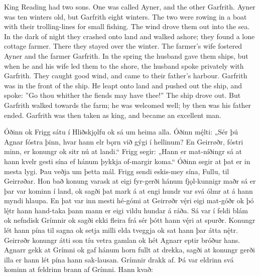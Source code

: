 \bpb King Reading had two sons. One was called Ayner, and the other Garfrith.
Ayner was ten winters old, but Garfrith eight winters. The two were rowing in a boat with their trolling-lines for small fishing.
The wind drove them out into the sea. In the dark of night they crashed onto land and walked ashore; they found a lone cottage farmer.
There they stayed over the winter. The farmer’s wife fostered Ayner and the farmer Garfrith.
In the spring the husband gave them ships, but when he and his wife led them to the shore, the husband spoke privately with Garfrith.
They caught good wind, and came to their father’s harbour. Garfrith was in the front of the ship.
He leapt onto land and pushed out the ship, and spoke: ”Go thou whither the fiends may have thee!”
The ship drove out. But Garfrith walked towards the farm; he was welcomed well; by then was his father ended.
Garfrith was then taken as king, and became an excellent man.\epb\epg


\bpg\bpa{}%
Óðinn ok Frigg sátu í Hliðskjǫlfu ok sá um heima alla.
Óðinn mę́lti: „Sér þú Agnar fóstra þinn, hvar hann elr bǫrn við gýgi í hellinum?
En Geirrøðr, fóstri minn, er konungr ok sitr nú at landi.“
Frigg segir: „Hann er mat-níðingr sá at hann kvelr gesti sína ef hánum þykkja of-margir koma.“
Óðinn segir at þat er in mesta lygi. Þau veðja um þetta mál.
Frigg sendi eskis-mey sína, Fullu, til Geirrøðar. Hon bað konung varask at eigi fyr-gerði hánum fjǫl-kunnigr maðr sá er þar var kominn í land, ok sagði þat mark á at engi hundr var svá ólmr at á hann myndi hlaupa.
En þat var inn mesti hé-gómi at Geirrøðr vę́ri eigi mat-góðr ok þó lę́tr hann hand-taka þann mann er eigi vildu hundar á ráða.
Sá var í feldi blám ok nefndisk Grímnir ok sagði ekki fleira frá sér þótt hann vę́ri at spurðr.
Konungr lét hann pína til sagna ok setja milli elda tveggja ok sat hann þar átta nę́tr.
Geirrøðr konungr átti son tíu vetra gamlan ok hét Agnarr eptir bróður hans.
Agnarr gekk at Grímni ok gaf hánum horn fullt at drekka, sagði at konungr gerði illa er hann lét pína hann sak-lausan.
Grímnir drakk af. Þá var eldrinn svá kominn at feldrinn brann af Grímni. Hann kvað:\epa

